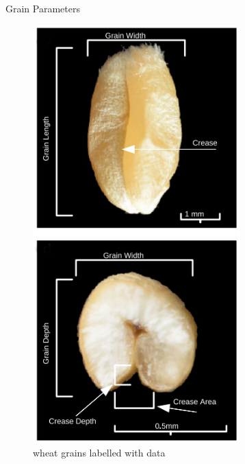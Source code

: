 \documentclass[final]{beamer}
\begin{document}
\begin{frame}{}
\begin{textblock}{27.7}
\begin{block}{Grain Parameters}
      \begin{multicols}{2}

        \begin{figure}[htb]
          \centering
          \includegraphics[width=8cm]{collection2.png}
          \caption{\label{fig:real} wheat grains labelled with data}
        \end{figure}

        \columnbreak


\end{multicols}
\end{block}
\end{textblock}
\end{frame}
\end{document}
